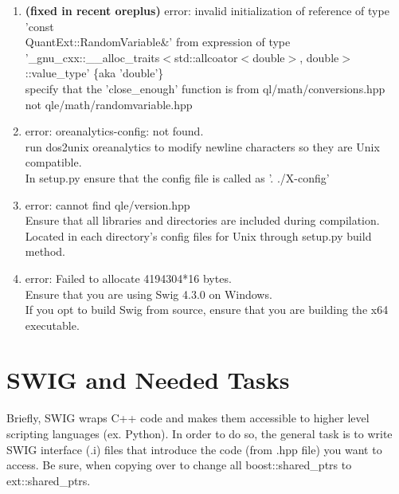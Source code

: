 \documentclass[10pt]{article}
\begin{document}
\begin{enumerate}
    \item \textbf{(fixed in recent oreplus)} error: invalid initialization of reference of type 'const \\ QuantExt::RandomVariable\&' from expression of type '\_gnu\_cxx::\_\_alloc\_traits$<$std::allcoator$<$double$>$, double$>$::value\_type' \{aka 'double'\} \\
    \-\hspace{1cm} specify that the 'close\_enough' function is from ql/math/conversions.hpp \\ \-\hspace{1cm} not qle/math/randomvariable.hpp \\

    \item error: oreanalytics-config: not found. \\
    \-\hspace{1cm} run dos2unix oreanalytics to modify newline characters so they are Unix compatible. \\ \-\hspace{1cm}In setup.py ensure that the config file is called as '. ./X-config'

    \item error: cannot find qle/version.hpp \\
    \-\hspace{1cm} Ensure that all libraries and directories are included during compilation. \\ \-\hspace{1cm} Located in each directory's config files for Unix through setup.py build method.

    \item error: Failed to allocate 4194304*16 bytes. \\
    \-\hspace{1cm} Ensure that you are using Swig 4.3.0 on Windows. \\ \-\hspace{1cm} If you opt to build Swig from source, ensure that you are building the x64 executable.


\end{enumerate}

\pagebreak

\section*{SWIG and Needed Tasks}
Briefly, SWIG wraps C++ code and makes them accessible to higher level scripting languages (ex. Python). In order to do so, the general task is to write SWIG interface (.i) files that introduce the code (from .hpp file) you want to access. Be sure, when copying over to change all boost::shared\_ptrs to ext::shared\_ptrs.\\
\end{document}
